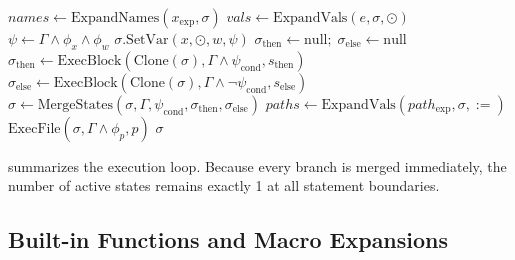 \documentclass[acmsmall,screen,review]{acmart}
\begin{document}
\begin{algorithm}[t]
\caption{Single-State Eager-Merge Symbolic Execution}
\label{alg:eager-merge}
\begin{algorithmic}[1]
    \State $\mathit{names} \gets \mathrm{ExpandNames}(x_{\text{exp}}, \sigma)$
    \State $\mathit{vals} \gets \mathrm{ExpandVals}(e, \sigma, \odot)$
        \State $\psi \gets \Gamma \wedge \phi_x \wedge \phi_w$
          \State $\sigma.\mathrm{SetVar}(x, \odot, w, \psi)$
        \EndIf
      \EndFor
    \EndFor
    \State $\sigma_{\text{then}} \gets \text{null}; \; \sigma_{\text{else}} \gets \text{null}$
      \State $\sigma_{\text{then}} \gets \mathrm{ExecBlock}(\mathrm{Clone}(\sigma), \Gamma \wedge \psi_{\text{cond}}, s_{\text{then}})$
    \EndIf
      \State $\sigma_{\text{else}} \gets \mathrm{ExecBlock}(\mathrm{Clone}(\sigma), \Gamma \wedge \neg \psi_{\text{cond}}, s_{\text{else}})$
    \EndIf
    \State $\sigma \gets \mathrm{MergeStates}(\sigma, \Gamma, \psi_{\text{cond}}, \sigma_{\text{then}}, \sigma_{\text{else}})$
    \State $\mathit{paths} \gets \mathrm{ExpandVals}(path_{\text{exp}}, \sigma, \mathtt{:=})$
      \State $\mathrm{ExecFile}(\sigma, \Gamma \wedge \phi_p, p)$
    \EndFor
  \EndIf
  \State \Return $\sigma$
\EndFunction
\end{algorithmic}
\end{algorithm}

 summarizes the execution loop. Because every branch is merged immediately, the number of active states remains exactly 1 at all statement boundaries.

\subsection{Built-in Functions and Macro Expansions}
\label{sec:semantics:builtins}
\end{document}
